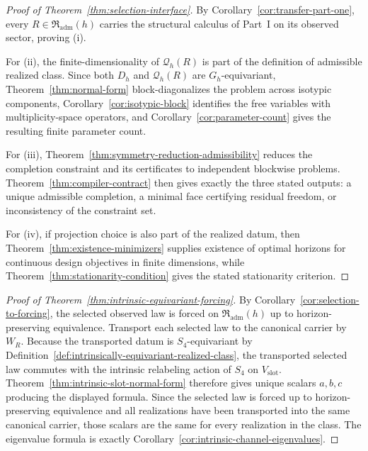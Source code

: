 \begin{proof}[Proof of Theorem~\ref{thm:selection-interface}]
\label{proof:thm:selection-interface}
By Corollary~\ref{cor:transfer-part-one}, every
$R\in\mathfrak R_{\mathrm{adm}}(h)$ carries the structural calculus of Part~I
on its observed sector, proving (i).

For (ii), the finite-dimensionality of $\mathcal Q_h(R)$ is part of the
definition of admissible realized class. Since both $D_h$ and $\mathcal Q_h(R)$
are $G_h$-equivariant, Theorem~\ref{thm:normal-form} block-diagonalizes the
problem across isotypic components, Corollary~\ref{cor:isotypic-block} identifies
the free variables with multiplicity-space operators, and
Corollary~\ref{cor:parameter-count} gives the resulting finite parameter count.

For (iii), Theorem~\ref{thm:symmetry-reduction-admissibility} reduces the
completion constraint and its certificates to independent blockwise problems.
Theorem~\ref{thm:compiler-contract} then gives exactly the three stated outputs:
a unique admissible completion, a minimal face certifying residual freedom, or
inconsistency of the constraint set.

For (iv), if projection choice is also part of the realized datum, then
Theorem~\ref{thm:existence-minimizers} supplies existence of optimal horizons
for continuous design objectives in finite dimensions, while
Theorem~\ref{thm:stationarity-condition} gives the stated stationarity
criterion.
\end{proof}

\begin{proof}[Proof of Theorem~\ref{thm:intrinsic-equivariant-forcing}]
\label{proof:thm:intrinsic-equivariant-forcing}
By Corollary~\ref{cor:selection-to-forcing}, the selected observed law is
forced on $\mathfrak R_{\mathrm{adm}}(h)$ up to horizon-preserving
equivalence. Transport each selected law to the canonical carrier by $W_R$.
Because the transported datum is $S_4$-equivariant by
Definition~\ref{def:intrinsically-equivariant-realized-class}, the transported
selected law commutes with the intrinsic relabeling action of $S_4$ on
$V_{\mathrm{slot}}$. Theorem~\ref{thm:intrinsic-slot-normal-form} therefore
gives unique scalars $a,b,c$ producing the displayed formula. Since the
selected law is forced up to horizon-preserving equivalence and all realizations
have been transported into the same canonical carrier, those scalars are the
same for every realization in the class. The eigenvalue formula is exactly
Corollary~\ref{cor:intrinsic-channel-eigenvalues}.
\end{proof}

